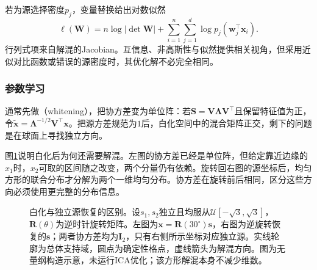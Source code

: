 若为源选择密度$p_j$，变量替换给出对数似然
\begin{equation}
  \ell(\bm{W})
  =n\log|\det\bm{W}|
   +\sum_{i=1}^{n}\sum_{j=1}^{d}
        \log p_j(\bm{w}_j^{\top}\bm{x}_i).
  \label{eq:dim-ica-likelihood}
\end{equation}
行列式项来自解混的Jacobian。互信息、非高斯性与似然提供相关视角，但采用近似对比函数或错误的源密度时，其优化解不必完全相同。

\subsubsection{参数学习}
\label{sec:dim-ica-learning}

通常先做（whitening），把协方差变为单位阵：若$\bm{S}=\bm{V}\bm{\Lambda}\bm{V}^{\top}$且保留特征值为正，令$\widetilde{\bm{x}}=\bm{\Lambda}^{-1/2}\bm{V}^{\top}\bm{x}$。把源方差规范为$1$后，白化空间中的混合矩阵正交，剩下的问题是在球面上寻找独立方向。

图\ref{fig:dim-ica-whitening}说明白化后为何还需要解混。左图的协方差已经是单位阵，但给定靠近边缘的$x_1$时，$x_2$可取的区间随之改变，两个分量仍有依赖。旋转回右图的源坐标后，均匀方形的联合分布才分解为两个一维均匀分布。协方差在旋转前后相同，区分这些方向必须使用更完整的分布信息。

\begin{figure}[!ht]
  \centering
  
  \caption{白化与独立源恢复的区别。设$s_1,s_2$独立且均服从$\mathcal{U}[-\sqrt3,\sqrt3]$，$\bm{R}(\theta)$为逆时针旋转矩阵。左图为$\bm{x}=\bm{R}(30^\circ)\bm{s}$，右图为逆旋转恢复的$\bm{s}$；两者协方差均为$\bm{I}_2$，只有右侧所示坐标对应独立源。实线轮廓为总体支持域，圆点为确定性格点，虚线箭头为解混方向。图为无量纲构造示意，未运行ICA优化；该方形解混本身不减少维数。}
  \label{fig:dim-ica-whitening}
\end{figure}

